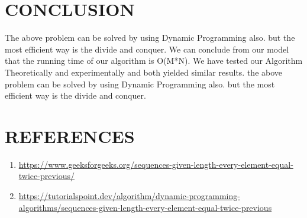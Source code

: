 \documentclass[conference]{IEEEtran}
\begin{document}
\section{CONCLUSION}
The above problem can be solved by using Dynamic Programming also. but the most efficient way is the divide and conquer.
We can conclude from our model that the running time
of our algorithm is O(M*N). We have tested our Algorithm
Theoretically and experimentally and both yielded similar results. 
the above problem can be solved by using Dynamic Programming also. but the most efficient way is the divide and conquer.

\section{REFERENCES}
\begin{enumerate}
    \item \url{https://www.geeksforgeeks.org/sequences-given-length-every-element-equal-twice-previous/}
    \item \url{https://tutorialspoint.dev/algorithm/dynamic-programming-algorithms/sequences-given-length-every-element-equal-twice-previous }
\end{enumerate}
\end{document}
